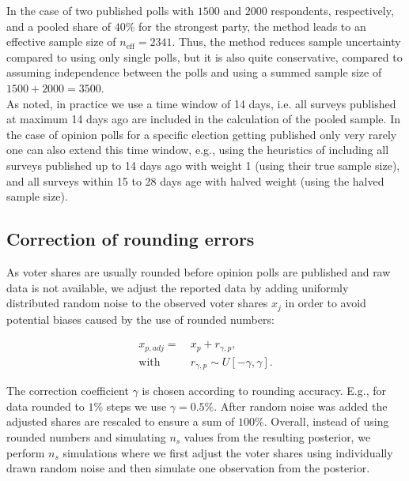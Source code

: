 \documentclass[smallcondensed]{svjour3}     %
\begin{document}
In the case of two published polls with $1500$ and $2000$ respondents, respectively,
and a pooled share of $40\%$ for the strongest party, the method leads
to an effective sample size of $n_{\text{eff}} = 2341$. Thus, the method reduces
sample uncertainty compared to using only single polls, but it is also quite
conservative, compared to assuming independence between the polls and using a
summed sample size of $1500 + 2000 = 3500$.\\

As noted, in practice we use a time window of 14 days, i.e. all surveys published
at maximum 14 days ago are included in the calculation of the pooled sample. In
the case of opinion polls for a specific election getting published only very
rarely one can also extend this time window, e.g., using the heuristics of
including all surveys published up to 14 days ago with weight 1
(using their true sample size), and all surveys within 15 to 28 days age with
halved weight (using the halved sample size).



\subsection{Correction of rounding errors}\label{ssec:rounding}
As voter shares are usually rounded before opinion polls are published and
raw data is not available, we adjust the reported data by adding uniformly
distributed random noise to the observed voter shares $x_j$ in order to avoid
potential biases caused by the use of rounded numbers:

\begin{equation}
\begin{aligned}
x_{p,adj} = \ &x_p + r_{\gamma,p}, \\
\text{with} \ \ \ \ \ &r_{\gamma,p} \sim U[-\gamma,\gamma].
\end{aligned}
\end{equation}

The correction coefficient $\gamma$ is chosen according to rounding accuracy.
E.g., for data rounded to $1\%$ steps we use $\gamma = 0.5\%$. After random noise
was added the adjusted shares are rescaled to ensure a sum of $100\%$. Overall,
instead of using rounded numbers and simulating $n_s$ values from the resulting
posterior, we perform $n_s$ simulations where we first adjust the voter shares
using individually drawn random noise and then simulate one observation from the
posterior.\\
\end{document}
